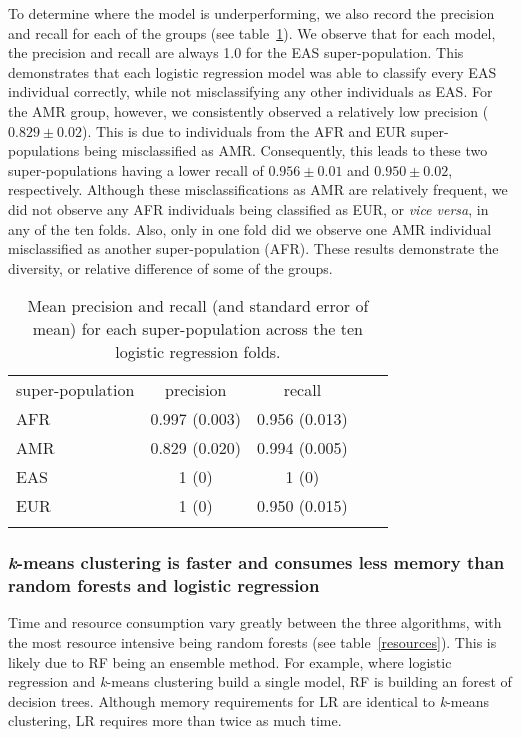 \documentclass{llncs}
\newcommand{\kMeans}{\textit{k}-means }
\begin{document}
{To determine where the model is underperforming, we also record the precision and recall for each of the groups (see table~\ref{PR}).
We observe that for each model, the precision and recall are always 1.0 for the EAS super-population.
This demonstrates that each logistic regression model was able to classify every EAS individual correctly, while not misclassifying any other individuals as EAS.
For the AMR group, however, we consistently observed a relatively low precision (\(0.829 \pm{} 0.02 \)).
This is due to individuals from the AFR and EUR super-populations being misclassified as AMR.
Consequently, this leads to these two super-populations having a lower recall of \(0.956 \pm 0.01 \) and \(0.950 \pm 0.02 \), respectively.
Although these misclassifications as AMR are relatively frequent, we did not observe any AFR individuals being classified as EUR, or {\it vice versa}, in any of the ten folds.
Also, only in one fold did we observe one AMR individual misclassified as another super-population (AFR).
These results demonstrate the diversity, or relative difference of some of the groups. 

\begin{table}
\caption{Mean precision and recall (and standard error of mean) for each super-population across the ten logistic regression folds.}
\begin{center}
\renewcommand{\arraystretch}{1.4}
\setlength\tabcolsep{3pt}
\begin{tabular}{lcccc}
\hline\noalign{\smallskip}
super-population  & precision & recall \\
AFR  & 0.997 (0.003) & 0.956 (0.013) \\
AMR & 0.829 (0.020) & 0.994 (0.005) \\
EAS  & 1 (0) & 1 (0) \\
EUR  & 1 (0) & 0.950 (0.015) \\
\noalign{\smallskip}
\hline
\label{PR}
\end{tabular}
\end{center}
\end{table}


\subsubsection{\kMeans{} clustering is faster and consumes less memory than random forests and logistic regression}

Time and resource consumption vary greatly between the three algorithms, with the most resource intensive being random forests (see table~\ref{resources}).
This is likely due to RF being an ensemble method. For example, where logistic regression and \kMeans{} clustering build a single model,
RF is building an forest of decision trees. Although memory requirements for LR are identical to \kMeans{} clustering, LR requires more than twice as much time.

}
\end{document}
